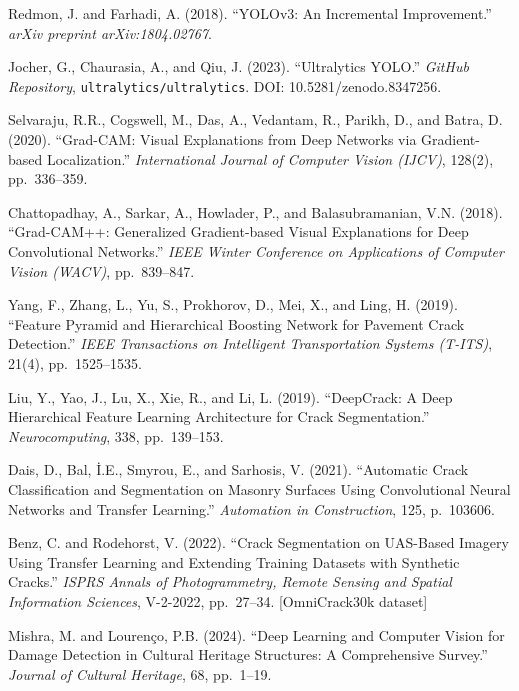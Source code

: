 \documentclass[12pt,a4paper]{article}
\begin{document}
\begin{enumerate}[leftmargin=*, label={[\arabic*]}]
  \item Redmon, J. and Farhadi, A. (2018). ``YOLOv3: An Incremental Improvement.'' \textit{arXiv preprint arXiv:1804.02767}.

  \item Jocher, G., Chaurasia, A., and Qiu, J. (2023). ``Ultralytics YOLO.'' \textit{GitHub Repository}, \texttt{ultralytics/ultralytics}. DOI: 10.5281/zenodo.8347256.

  \item Selvaraju, R.R., Cogswell, M., Das, A., Vedantam, R., Parikh, D., and Batra, D. (2020). ``Grad-CAM: Visual Explanations from Deep Networks via Gradient-based Localization.'' \textit{International Journal of Computer Vision (IJCV)}, 128(2), pp.\ 336--359.

  \item Chattopadhay, A., Sarkar, A., Howlader, P., and Balasubramanian, V.N. (2018). ``Grad-CAM++: Generalized Gradient-based Visual Explanations for Deep Convolutional Networks.'' \textit{IEEE Winter Conference on Applications of Computer Vision (WACV)}, pp.\ 839--847.

  \item Yang, F., Zhang, L., Yu, S., Prokhorov, D., Mei, X., and Ling, H. (2019). ``Feature Pyramid and Hierarchical Boosting Network for Pavement Crack Detection.'' \textit{IEEE Transactions on Intelligent Transportation Systems (T-ITS)}, 21(4), pp.\ 1525--1535.

  \item Liu, Y., Yao, J., Lu, X., Xie, R., and Li, L. (2019). ``DeepCrack: A Deep Hierarchical Feature Learning Architecture for Crack Segmentation.'' \textit{Neurocomputing}, 338, pp.\ 139--153.

  \item Dais, D., Bal, \.{I}.E., Smyrou, E., and Sarhosis, V. (2021). ``Automatic Crack Classification and Segmentation on Masonry Surfaces Using Convolutional Neural Networks and Transfer Learning.'' \textit{Automation in Construction}, 125, p.\ 103606.

  \item Benz, C. and Rodehorst, V. (2022). ``Crack Segmentation on UAS-Based Imagery Using Transfer Learning and Extending Training Datasets with Synthetic Cracks.'' \textit{ISPRS Annals of Photogrammetry, Remote Sensing and Spatial Information Sciences}, V-2-2022, pp.\ 27--34. [OmniCrack30k dataset]

  \item Mishra, M. and Louren\c{c}o, P.B. (2024). ``Deep Learning and Computer Vision for Damage Detection in Cultural Heritage Structures: A Comprehensive Survey.'' \textit{Journal of Cultural Heritage}, 68, pp.\ 1--19.


\end{enumerate}
\end{document}
